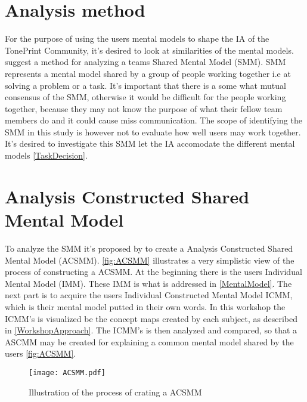 \section{Analysis method}
\label{AnalysisMethod}

\noindent
For the purpose of using the users mental models to shape the IA of the TonePrint Community, it's desired to look at similarities of the mental models. \textcite{WEB:ConceptMapAnalysis} suggest a method for analyzing a teams Shared Mental Model (SMM). SMM represents a mental model shared by a group of people working together i.e  at solving a problem or a task. It's important that there is a some what mutual consensus of the SMM, otherwise it would be difficult for the people working together, because they may not know the purpose of what their fellow team members do and it could cause miss communication. The scope of identifying the SMM in this study is however not to evaluate how well users may work together. It's desired to investigate this SMM let the IA accomodate the different mental models \autoref{TaskDecision}.


\section{Analysis Constructed Shared Mental Model}
\label{ACSMM}
To analyze the SMM it's proposed by \textcite{WEB:ConceptMapAnalysis} to create a Analysis Constructed Shared Mental Model (ACSMM). \autoref{fig:ACSMM} illustrates a very simplistic view of the process of constructing a ACSMM. At the beginning there is the users Individual Mental Model (IMM). These IMM is what is addressed in \autoref{MentalModel}. The next part is to acquire the users Individual Constructed Mental Model ICMM, which is their mental model putted in their own words. In this workshop the ICMM's is visualized be the concept maps created by each subject, as described in \autoref{WorkshopApproach}. The ICMM's is then analyzed and compared, so that a ASCMM may be created for explaining a common mental model shared by the users \autoref{fig:ACSMM}.  

\begin{figure}[H]
	\centering
	\texttt{[image: ACSMM.pdf]}
	\caption{Illustration of the process of crating a ACSMM}
	\label{fig:ACSMM}
\end{figure}

